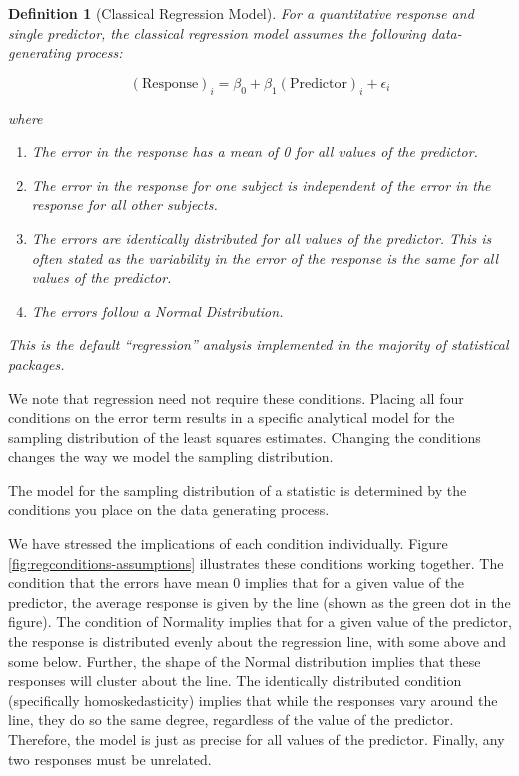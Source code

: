 \documentclass[
]{book}
\providecommand{\tightlist}{%
  \setlength{\itemsep}{0pt}\setlength{\parskip}{0pt}}
\theoremstyle{plain}
\theoremstyle{mydefn}
\newtheorem{definition}{Definition}[chapter]
\theoremstyle{myexmpl}
\theoremstyle{remark}
\begin{document}
\begin{definition}[Classical Regression Model]
\protect\hypertarget{def:defn-classical-regression}{}{\label{def:defn-classical-regression} {} }For a quantitative response and single predictor, the classical regression model assumes the following data-generating process:

\[(\text{Response})_i = \beta_0 + \beta_1 (\text{Predictor})_{i} + \epsilon_i\]

where

\begin{enumerate}
\def\labelenumi{\arabic{enumi}.}
\tightlist
\item
  The error in the response has a mean of 0 for all values of the predictor.
\item
  The error in the response for one subject is independent of the error in the response for all other subjects.
\item
  The errors are identically distributed for all values of the predictor. This is often stated as the variability in the error of the response is the same for all values of the predictor.
\item
  The errors follow a Normal Distribution.
\end{enumerate}

This is the default ``regression'' analysis implemented in the majority of statistical packages.
\end{definition}

We note that regression need not require these conditions. Placing all four conditions on the error term results in a specific analytical model for the sampling distribution of the least squares estimates. Changing the conditions changes the way we model the sampling distribution.

\begin{rmdkeyidea}
The model for the sampling distribution of a statistic is determined by the conditions you place on the data generating process.
\end{rmdkeyidea}

We have stressed the implications of each condition individually. Figure \ref{fig:regconditions-assumptions} illustrates these conditions working together. The condition that the errors have mean 0 implies that for a given value of the predictor, the average response is given by the line (shown as the green dot in the figure). The condition of Normality implies that for a given value of the predictor, the response is distributed evenly about the regression line, with some above and some below. Further, the shape of the Normal distribution implies that these responses will cluster about the line. The identically distributed condition (specifically homoskedasticity) implies that while the responses vary around the line, they do so the same degree, regardless of the value of the predictor. Therefore, the model is just as precise for all values of the predictor. Finally, any two responses must be unrelated.
\end{document}
